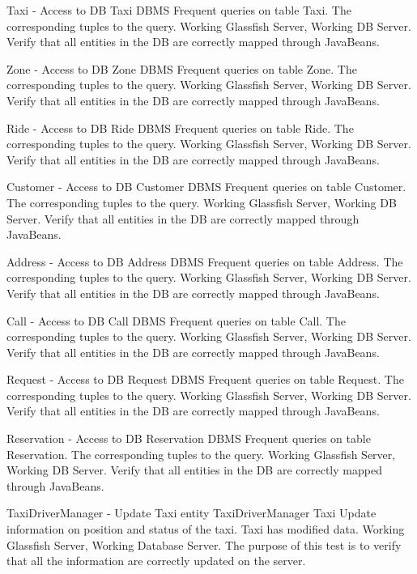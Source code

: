 \testx
{Taxi - Access to DB}
{Taxi}
{DBMS}
{Frequent queries on table Taxi.}
{The corresponding tuples to the query.}
{Working Glassfish Server, Working DB Server.}
{Verify that all entities in the DB are correctly mapped through JavaBeans.}

\testx
{Zone - Access to DB}
{Zone}
{DBMS}
{Frequent queries on table Zone.}
{The corresponding tuples to the query.}
{Working Glassfish Server, Working DB Server.}
{Verify that all entities in the DB are correctly mapped through JavaBeans.}

\testx
{Ride - Access to DB}
{Ride}
{DBMS}
{Frequent queries on table Ride.}
{The corresponding tuples to the query.}
{Working Glassfish Server, Working DB Server.}
{Verify that all entities in the DB are correctly mapped through JavaBeans.}

\testx
{Customer - Access to DB}
{Customer}
{DBMS}
{Frequent queries on table Customer.}
{The corresponding tuples to the query.}
{Working Glassfish Server, Working DB Server.}
{Verify that all entities in the DB are correctly mapped through JavaBeans.}

\testx
{Address - Access to DB}
{Address}
{DBMS}
{Frequent queries on table Address.}
{The corresponding tuples to the query.}
{Working Glassfish Server, Working DB Server.}
{Verify that all entities in the DB are correctly mapped through JavaBeans.}

\testx
{Call - Access to DB}
{Call}
{DBMS}
{Frequent queries on table Call.}
{The corresponding tuples to the query.}
{Working Glassfish Server, Working DB Server.}
{Verify that all entities in the DB are correctly mapped through JavaBeans.}

\testx
{Request - Access to DB}
{Request}
{DBMS}
{Frequent queries on table Request.}
{The corresponding tuples to the query.}
{Working Glassfish Server, Working DB Server.}
{Verify that all entities in the DB are correctly mapped through JavaBeans.}

\testx
{Reservation - Access to DB}
{Reservation}
{DBMS}
{Frequent queries on table Reservation.}
{The corresponding tuples to the query.}
{Working Glassfish Server, Working DB Server.}
{Verify that all entities in the DB are correctly mapped through JavaBeans.}

\testx
{TaxiDriverManager - Update Taxi entity}
{TaxiDriverManager}
{Taxi}
{Update information on position and status of the taxi.}
{Taxi has modified data.}
{Working Glassfish Server, Working Database Server.}
{The purpose of this test is to verify that all the information are correctly updated on the server.}

